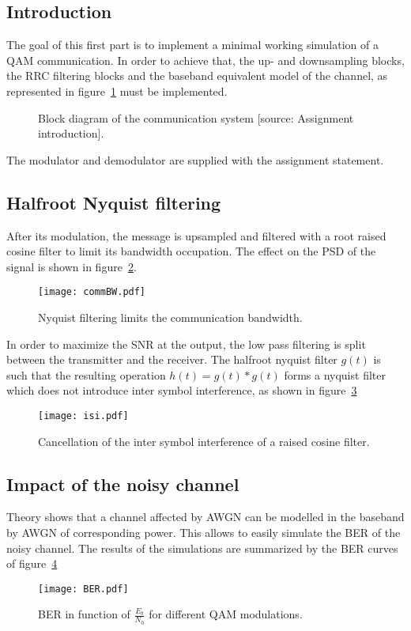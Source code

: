 \subsection{Introduction}
The goal of this first part is to implement a minimal working simulation of a QAM communication.
In order to achieve that, the up- and downsampling blocks, the RRC filtering blocks and the baseband equivalent model of the channel, as represented in figure~\ref{fig:chain} must be implemented.
\begin{figure}[htbp]
\centering

\caption{Block diagram of the communication system [source: Assignment introduction].\label{fig:chain}}
\end{figure}
The modulator and demodulator are supplied with the assignment statement.

\subsection{Halfroot Nyquist filtering}
After its modulation, the message is upsampled and filtered with a root raised cosine filter to limit its bandwidth occupation.
The effect on the PSD of the signal is shown in figure~\ref{fig:LPF}.
\begin{figure}[htbp]
\centering
\texttt{[image: commBW.pdf]}
\caption{Nyquist filtering limits the communication bandwidth.\label{fig:LPF}}
\end{figure}

In order to maximize the SNR at the output, the low pass filtering is split between the transmitter and the receiver.
The halfroot nyquist filter $g(t)$ is such that the resulting operation $h(t) = g(t)*g(t)$ forms a nyquist filter which does not introduce inter symbol interference, as shown in figure~\ref{fig:noISI}
\begin{figure}
\centering
\texttt{[image: isi.pdf]}
\caption{Cancellation of the inter symbol interference of a raised cosine filter.\label{fig:noISI}}
\end{figure}

\subsection{Impact of the noisy channel}
Theory shows that a channel affected by AWGN can be modelled in the baseband by AWGN of corresponding power.
This allows to easily simulate the BER of the noisy channel.
The results of the simulations are summarized by the BER curves of figure~\ref{fig:BER}
\begin{figure}[htbp]
\texttt{[image: BER.pdf]}
\caption{BER in function of $\frac{E_b}{N_0}$ for different QAM modulations.\label{fig:BER}}
\end{figure}

